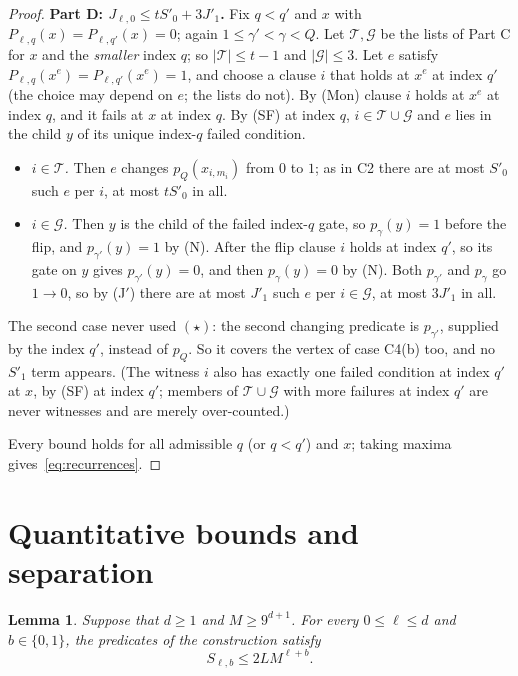 \documentclass[11pt]{article}
\newtheorem{lemma}[theorem]{Lemma}
\theoremstyle{definition}
\theoremstyle{remark}
\begin{document}
\begin{proof}
\smallskip\noindent\textbf{Part D: $J_{\ell,0}\le tS'_0+3J'_1$.}
Fix $q<q'$ and $x$ with $P_{\ell,q}(x)=P_{\ell,q'}(x)=0$; again
$1\le\gamma'<\gamma<Q$. Let $\mathcal T,\mathcal G$ be the lists of Part C for
$x$ and the \emph{smaller} index $q$; so $|\mathcal T|\le t-1$ and
$|\mathcal G|\le3$. Let $e$ satisfy
$P_{\ell,q}(x^e)=P_{\ell,q'}(x^e)=1$, and choose a clause $i$ that holds at
$x^e$ at index $q'$ (the choice may depend on $e$; the lists do not). By (Mon)
clause $i$ holds at $x^e$ at index $q$, and it fails at $x$ at index $q$. By
(SF) at index $q$, $i\in\mathcal T\cup\mathcal G$ and $e$ lies in the child
$y$ of its unique index-$q$ failed condition.
\begin{itemize}[leftmargin=*,itemsep=1pt]
\item \emph{$i\in\mathcal T$.} Then $e$ changes $p_Q(x_{i,m_i})$ from $0$ to
 $1$; as in C2 there are at most $S'_0$ such $e$ per $i$, at most $tS'_0$ in
 all.
\item \emph{$i\in\mathcal G$.} Then $y$ is the child of the failed index-$q$
 gate, so $p_\gamma(y)=1$ before the flip, and $p_{\gamma'}(y)=1$ by (N).
 After the flip clause $i$ holds at index $q'$, so its gate on $y$ gives
 $p_{\gamma'}(y)=0$, and then $p_\gamma(y)=0$ by (N). Both $p_{\gamma'}$ and
 $p_\gamma$ go $1\to0$, so by (J$'$) there are at most $J'_1$ such $e$ per
 $i\in\mathcal G$, at most $3J'_1$ in all.
\end{itemize}
The second case never used $(\star)$: the second changing predicate is
$p_{\gamma'}$, supplied by the index $q'$, instead of $p_Q$. So it covers the
vertex of case C4(b) too, and no $S'_1$ term appears. (The witness $i$ also
has exactly one failed condition at index $q'$ at $x$, by (SF) at index $q'$;
members of $\mathcal T\cup\mathcal G$ with more failures at index $q'$ are
never witnesses and are merely over-counted.)

Every bound holds for all admissible $q$ (or $q<q'$) and $x$; taking maxima
gives~\eqref{eq:recurrences}.
\end{proof}

\section{Quantitative bounds and separation}
\label{sec:separation}

\begin{lemma}
\label{lem:quantitative-profiles}
Suppose that $d\geq 1$ and $M\geq 9^{d+1}$.
For every $0\leq\ell\leq d$ and $b\in\{0,1\}$, the predicates of the
construction satisfy
\[
  S_{\ell,b}\leq 2L M^{\ell+b}.
\]
\end{lemma}
\end{document}
